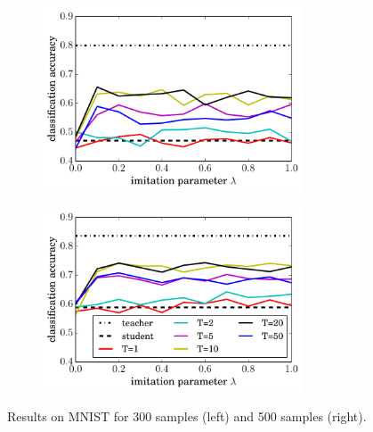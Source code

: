\documentclass{article}
\begin{document}
\begin{figure}
  \begin{subfigure}{0.5\textwidth}
    \begin{center}
    \includegraphics[width=0.85\textwidth]{figures/distillation_mnist_300.pdf}
    \end{center}
  \end{subfigure}
  \begin{subfigure}{0.5\textwidth}
    \begin{center}
    \includegraphics[width=0.85\textwidth]{figures/distillation_mnist_500.pdf}
    \end{center}
  \end{subfigure}
  \caption{Results on MNIST for 300 samples (left) and 500 samples (right).}
  \label{fig:mnist}
\end{figure}
\end{document}
